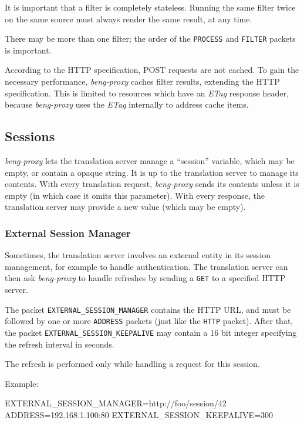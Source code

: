 \documentclass[a4paper,12pt]{article}
\begin{document}
It is important that a filter is completely stateless.  Running the
same filter twice on the same source must always render the same
result, at any time.

There may be more than one filter; the order of the \verb|PROCESS|
and \verb|FILTER| packets is important.

According to the HTTP specification, POST requests are not cached.  To
gain the necessary performance, \emph{beng-proxy} caches filter
results, extending the HTTP specification.  This is limited to
resources which have an \emph{ETag} response header, because
\emph{beng-proxy} uses the \emph{ETag} internally to address cache
items.

\subsection{Sessions}
\label{sessions}

\emph{beng-proxy} lets the translation server manage a ``session''
variable, which may be empty, or contain a opaque string.  It is up to
the translation server to manage its contents.  With every translation
request, \emph{beng-proxy} sends its contents unless it is empty (in
which case it omits this parameter).  With every response, the
translation server may provide a new value (which may be empty).

\subsubsection{External Session Manager}

Sometimes, the translation server involves an external entity in its
session management, for example to handle authentication.  The
translation server can then ask \emph{beng-proxy} to handle refreshes
by sending a \texttt{GET} to a specified HTTP server.

The packet \verb|EXTERNAL_SESSION_MANAGER| contains the HTTP URL, and
must be followed by one or more \verb|ADDRESS| packets (just like the
\verb|HTTP| packet).  After that, the packet
\verb|EXTERNAL_SESSION_KEEPALIVE| may contain a 16 bit integer
specifying the refresh interval in seconds.

The refresh is performed only while handling a request for this
session.

Example:

\begin{verbatim*}
EXTERNAL_SESSION_MANAGER=http://foo/session/42
ADDRESS=192.168.1.100:80
EXTERNAL_SESSION_KEEPALIVE=300
\end{verbatim*}
\end{document}
